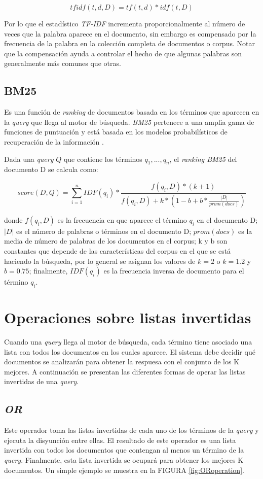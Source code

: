 $$ tfidf(t,d,D) = tf(t,d) * idf(t,D) $$

Por lo que el estadístico \textit{TF-IDF} incrementa proporcionalmente al número de veces que la palabra aparece en el documento, sin embargo es compensado por la frecuencia de la palabra en la colección completa de documentos o corpus. Notar que la compensación ayuda a controlar el hecho de que algunas palabras son generalmente más comunes que otras.


\subsection{BM25}
\label{marco:bm25}
Es una función de \textit{ranking} de documentos basada en los términos que aparecen en la \textit{query} que llega al motor de búsqueda. \textit{BM25} pertenece a una amplia gama de funciones de puntuación y está basada en los modelos probabilísticos de recuperación de la información \citep{Baeza-Yates:2011}.

Dada una \textit{query} $Q$ que contiene los términos $q_{1},...,q_{n}$, el \textit{ranking BM25} del documento D se calcula como: 

$$ score(D,Q) =  \displaystyle\sum_{i=1}^n IDF(q_{i}) * \frac{f(q_{i},D)*(k+1)}{f(q_{i},D)+k * (1 - b + b * \frac{|D|}{prom(docs)})} $$

donde $f(q_{i}, D)$ es la frecuencia en que aparece el término $q_{i}$ en el documento D; $|D|$ es el número de palabras o términos en el documento D; $prom(docs)$ es la media de número de palabras de los documentos en el corpus; k y b son constantes que depende de las características del corpus en el que se está haciendo la búsqueda, por lo general se asignan los valores de $k = 2$ o $k = 1.2$ y $b = 0.75$; finalmente, $IDF(q_{i})$ es la frecuencia inversa de documento para el término $q_{i}$.


\section{Operaciones sobre listas invertidas}
\label{marco:osli}
Cuando una \textit{query} llega al motor de búsqueda, cada término tiene asociado una lista con todos los documentos en los cuales aparece. El sistema debe decidir qué documentos se analizarán para obtener la respuesa con el conjunto de los K mejores.
A continuación se presentan las diferentes formas de operar las listas invertidas de una \textit{query}.

\subsection{\textit{OR}}
\label{marco:or}
Este operador toma las listas invertidas de cada uno de los términos de la \textit{query} y ejecuta la disyunción entre ellas. El resultado de este operador es una lista invertida con todos los documentos que contengan al menos un término de la \textit{query}. Finalmente, esta lista invertida se ocupará para obtener los mejores K documentos. Un simple ejemplo se muestra en la FIGURA \ref{fig:ORoperation}.

